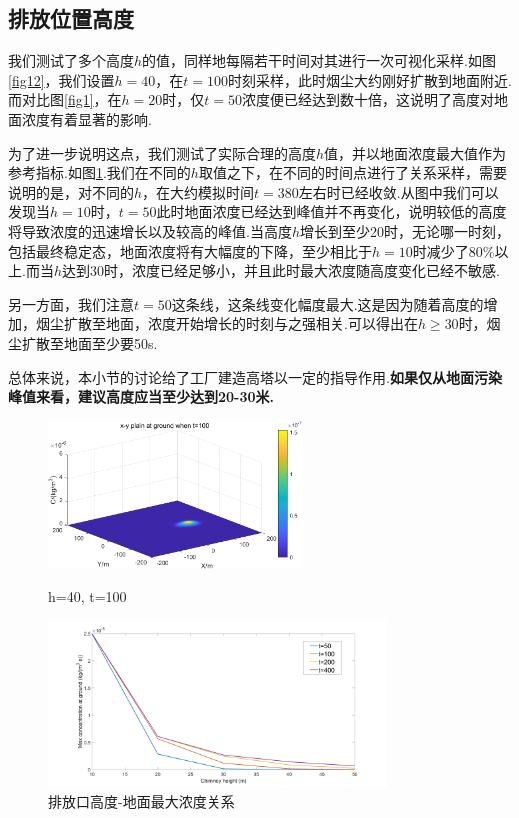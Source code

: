 \documentclass{article}
\begin{document}
	\subsection{排放位置高度}
	我们测试了多个高度$h$的值，同样地每隔若干时间对其进行一次可视化采样.如图\ref{fig12}，我们设置$h=40$，在$t=100$时刻采样，此时烟尘大约刚好扩散到地面附近.而对比图\ref{fig1}，在$h=20$时，仅$t=50$浓度便已经达到数十倍，这说明了高度对地面浓度有着显著的影响.
	\par 为了进一步说明这点，我们测试了实际合理的高度$h$值，并以地面浓度最大值作为参考指标.如图\ref{fig13}.我们在不同的$h$取值之下，在不同的时间点进行了关系采样，需要说明的是，对不同的$h$，在大约模拟时间$t=380$左右时已经收敛.从图中我们可以发现当$h=10$时，$t=50$此时地面浓度已经达到峰值并不再变化，说明较低的高度将导致浓度的迅速增长以及较高的峰值.当高度$h$增长到至少20时，无论哪一时刻，包括最终稳定态，地面浓度将有大幅度的下降，至少相比于$h=10$时减少了80\%以上.而当$h$达到30时，浓度已经足够小，并且此时最大浓度随高度变化已经不敏感.
	\par 另一方面，我们注意$t=50$这条线，这条线变化幅度最大.这是因为随着高度的增加，烟尘扩散至地面，浓度开始增长的时刻与之强相关.可以得出在$h\geq30$时，烟尘扩散至地面至少要50s.
	\par 总体来说，本小节的讨论给了工厂建造高塔以一定的指导作用.\textbf{如果仅从地面污染峰值来看，建议高度应当至少达到20-30米.}
	
	\begin{figure}[htbp]
		\centering
		\includegraphics[width=0.6\textwidth]{pics/h=40,t=100.png}
		\caption{h=40, t=100}
		\label{fig12}
		\includegraphics[width=0.8\textwidth]{pics/relation-h-max_c.png}
		\caption{排放口高度-地面最大浓度关系}
		\label{fig13}
	\end{figure}
\end{document}
